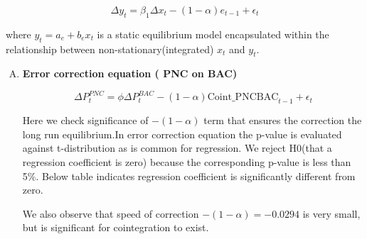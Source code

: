 \documentclass[a4paper, 11pt]{article}
\begin{document}
$$ \Delta y_t =  \beta_1 \Delta x_t -(1-\alpha) e_{t-1} +  \epsilon_t  $$

where $y_t = a_e + b_e x_t$ is a static equilibrium model encapsulated within the relationship between non-stationary(integrated) $x_t$ and $y_t$.

\begin{enumerate}[A.]
\item
\textbf{Error correction equation ( PNC on BAC)}

$$\Delta P^{PNC}_t = \phi \Delta P^{BAC}_{t} - (1-\alpha) \text{Coint\_PNCBAC}_{t-1} + \epsilon_t $$

Here we check significance of  $ -(1- \alpha)$ term that ensures the correction the long run equilibrium.In error correction equation the  p-value is evaluated against t-distribution as is common for regression. We  reject  H0(that a regression coefficient is zero) because the corresponding  p-value is less than 5\%. Below table indicates regression coefficient is significantly different from zero.

We also observe that speed of correction $ -(1- \alpha) = -0.0294$ is very small, but is significant for cointegration to exist.


\end{enumerate}
\end{document}

